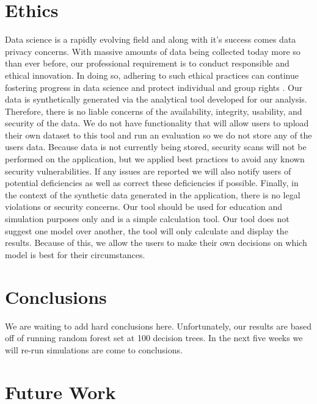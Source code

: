 \documentclass{llncs}
\begin{document}
\section{Ethics}
\noindent 
Data science is a rapidly evolving field and along with it's success comes data privacy concerns. With massive amounts of data being collected today more so than ever before, our professional requirement is to conduct responsible and ethical innovation. In doing so, adhering to such ethical practices can continue fostering progress in data science and protect individual and group rights \cite{floridi}. Our data is synthetically generated via the analytical tool developed for our analysis. Therefore, there is no liable concerns of the availability, integrity, usability, and security of the data. We do not have functionality that will allow users to upload their own dataset to this tool and run an evaluation so we do not store any of the users data. Because data is not currently being stored, security scans will not be performed on the application, but we applied best practices to avoid any known security vulnerabilities. If any issues are reported we will also notify users of potential deficiencies as well as correct these deficiencies if possible. Finally, in the context of the synthetic data generated in the application, there is no legal violations or security concerns.  Our tool should be used for education and simulation purposes only and is a simple calculation tool.  Our tool does not suggest one model over another, the tool will only calculate and display the results.  Because of this, we allow the users to make their own decisions on which model is best for their circumstances. 


\section{Conclusions}
\noindent 
We are waiting to add hard conclusions here.  Unfortunately, our results are based off of running random forest set at 100 decision trees.  In the next five weeks we will re-run simulations are come to conclusions.



\section{Future Work}
\noindent 
\end{document}
